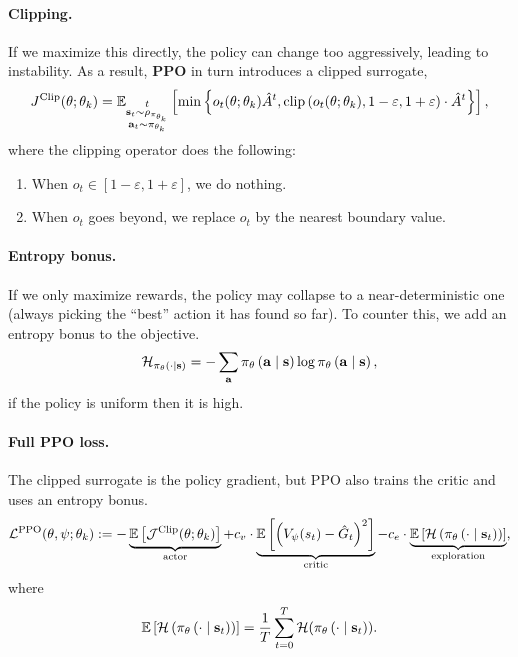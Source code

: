\documentclass[11pt]{article}  %
\begin{document}
\paragraph{Clipping.} If we maximize this directly, the policy can change too aggressively, leading to instability.
As a result, \textbf{PPO} in turn introduces a clipped surrogate,
\begin{align*}
  J^{\text{Clip}}(\theta; \theta_k) = \mathbb{E}_{\substack{t \\ \mathbf{s}_t \sim \rho_{\pi_{\theta_k}} \\ \mathbf{a}_t \sim \pi_{\theta_k}}}\left[\min\left\{ o_t(\theta; \theta_k) \hat{A}^t, \text{clip}\left( o_t(\theta; \theta_k), 1-\varepsilon, 1+\varepsilon \right)\cdot\hat{A}^t \right\}\right],
\end{align*}
where the clipping operator does the following:
\begin{enumerate}
  \item When $o_t \in [1 - \varepsilon, 1 + \varepsilon]$, we do nothing.
  \item When $o_t$ goes beyond, we replace $o_t$ by the nearest boundary value.
\end{enumerate}

\paragraph{Entropy bonus.}
If we only maximize rewards, the policy may collapse to a near-deterministic one (always picking the “best” action it has found so far).
To counter this, we add an entropy bonus to the objective.
\begin{align*}
  \mathcal{H}_{\pi_{\theta}\left( \cdot \mid \mathbf{s} \right)} = -\sum_{\mathbf{a}} \pi_{\theta}\left( \mathbf{a} \mid \mathbf{s} \right) \log \pi_{\theta}\left( \mathbf{a} \mid \mathbf{s} \right),
\end{align*}
if the policy is uniform then it is high.


\paragraph{Full PPO loss.}
The clipped surrogate is the policy gradient, but PPO also trains the critic and uses an entropy bonus.
\begin{align*}
  \mathcal{L}^{\text{PPO}}(\theta, \psi; \theta_k) := -\underbrace{\mathbb{E}\left[\mathcal{J}^{\text{Clip}}(\theta; \theta_k)\right]}_{\text{actor}} + c_v \cdot \underbrace{\mathbb{E}\left[\left( V_{\psi}(s_t) - \hat{G}_t \right)^2\right]}_{\text{critic}} - c_e \cdot \underbrace{\mathbb{E}\left[\mathcal{H}\left( \pi_{\theta}\left( \cdot \mid \mathbf{s}_t \right) \right)\right]}_{\text{exploration}},
\end{align*}
where 
\begin{align*}
  \mathbb{E}\left[\mathcal{H}\left( \pi_{\theta}\left( \cdot \mid \mathbf{s}_t \right) \right)\right] = \frac{1}{T}\sum_{t=0}^{T}\mathcal{H}(\pi_{\theta}\left( \cdot \mid \mathbf{s}_t \right)).
\end{align*}
\end{document}
